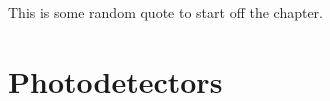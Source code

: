 \begin{savequote}[75mm] 
This is some random quote to start off the chapter.
\end{savequote}

\chapter{Photodetectors}

